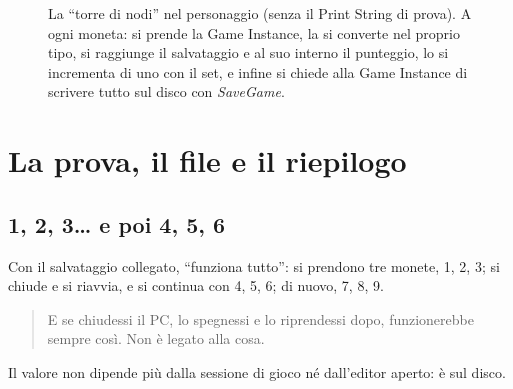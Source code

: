 \begin{figure}[htbp]
\centering
{}
\caption{La ``torre di nodi'' nel personaggio (senza il Print String di prova). A ogni moneta: si prende la Game
Instance, la si converte nel proprio tipo, si raggiunge il salvataggio e al suo
interno il punteggio, lo si incrementa di uno con il set, e infine si chiede
alla Game Instance di scrivere tutto sul disco con \emph{SaveGame}.}
\label{gd16:fig:torre}
\end{figure}

\section{La prova, il file e il riepilogo}
\label{gd16:sec:prova}

\subsection{1, 2, 3\dots{} e poi 4, 5, 6}

Con il salvataggio collegato, ``funziona tutto'': si prendono tre monete, 1, 2,
3; si chiude e si riavvia, e si continua con 4, 5, 6; di nuovo, 7, 8, 9.
\begin{quote}
E se chiudessi il PC, lo spegnessi e lo riprendessi dopo, funzionerebbe sempre
così. Non è legato alla cosa.
\end{quote}
Il valore non dipende più dalla sessione di gioco né dall'editor aperto: è sul
disco.

